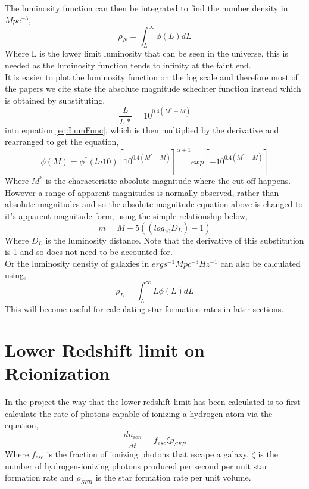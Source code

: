 \documentclass{article}
\begin{document}
The luminosity function can then be integrated to find the number density in $Mpc^{-3}$,
\begin{equation}
\rho_{N}=\int^{\infty}_{L}\phi(L)dL
\end{equation}
Where L is the lower limit luminosity that can be seen in the universe, this is needed as the luminosity function tends to infinity at the faint end.\\
It is easier to plot the luminosity function on the log scale and therefore most of the papers we cite state the absolute magnitude schechter function instead which is obtained by substituting,
\begin{equation}
\frac{L}{L*}=10^{0.4(M^{*}-M)}
\end{equation}
into equation \ref{eq:LumFunc}, which is then multiplied by the derivative and rearranged to get the equation,
\begin{equation}
\phi(M)=\phi^{*}(ln10)\left[10^{0.4(M^{*}-M)}\right]^{\alpha+1}exp\left[-10^{0.4(M^{*}-M)}\right]
\end{equation}
Where $M^{*}$ is the characteristic absolute magnitude where the cut-off happens.\\
However a range of apparent magnitudes is normally observed, rather than absolute magnitudes and so the absolute magnitude equation above is changed to it's apparent magnitude form, using the simple relationship below,
\begin{equation}
m=M+5((log_{10}D_{L})-1)
\end{equation}
Where $D_{L}$ is the luminosity distance. Note that the derivative of this substitution is 1 and so does not need to be accounted for.\\

Or the luminosity density of galaxies in $erg s^{-1}Mpc^{-3}Hz^{-1}$ can also be calculated using,
\begin{equation}
\rho_{L}=\int^{\infty}_{L}L\phi(L)dL
\end{equation}
This will become useful for calculating star formation rates in later sections.\\


\section{Lower Redshift limit on Reionization}
In the project the way that the lower redshift limit has been calculated is to first calculate the rate of photons capable of ionizing a hydrogen atom via the equation, \cite{2010Natur.468...49R}
\begin{equation}
\frac{dn_{ion}}{dt}=f_{esc}\zeta\rho_{SFR}  
\end{equation}
Where $f_{esc}$ is the fraction of ionizing photons that escape a galaxy, $\zeta$ is the number of hydrogen-ionizing photons produced per second per unit star formation rate and $\rho_{SFR}$ is the star formation rate per unit volume.\\
\end{document}
